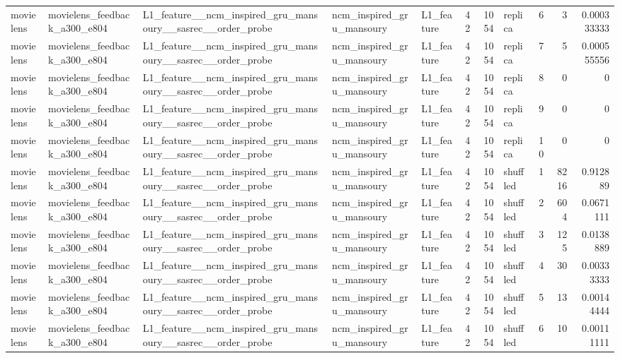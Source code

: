 \begin{table}[htbp!]
\begin{tabular}{lllllrrlrrr}
movielens & movielens\_feedback\_a300\_e804 & L1\_feature\_\_ncm\_inspired\_gru\_mansoury\_\_sasrec\_\_order\_probe & ncm\_inspired\_gru\_mansoury & L1\_feature & 42 & 1054 & replica & 6 & 3 & 0.000333333 \\
movielens & movielens\_feedback\_a300\_e804 & L1\_feature\_\_ncm\_inspired\_gru\_mansoury\_\_sasrec\_\_order\_probe & ncm\_inspired\_gru\_mansoury & L1\_feature & 42 & 1054 & replica & 7 & 5 & 0.000555556 \\
movielens & movielens\_feedback\_a300\_e804 & L1\_feature\_\_ncm\_inspired\_gru\_mansoury\_\_sasrec\_\_order\_probe & ncm\_inspired\_gru\_mansoury & L1\_feature & 42 & 1054 & replica & 8 & 0 & 0 \\
movielens & movielens\_feedback\_a300\_e804 & L1\_feature\_\_ncm\_inspired\_gru\_mansoury\_\_sasrec\_\_order\_probe & ncm\_inspired\_gru\_mansoury & L1\_feature & 42 & 1054 & replica & 9 & 0 & 0 \\
movielens & movielens\_feedback\_a300\_e804 & L1\_feature\_\_ncm\_inspired\_gru\_mansoury\_\_sasrec\_\_order\_probe & ncm\_inspired\_gru\_mansoury & L1\_feature & 42 & 1054 & replica & 10 & 0 & 0 \\
movielens & movielens\_feedback\_a300\_e804 & L1\_feature\_\_ncm\_inspired\_gru\_mansoury\_\_sasrec\_\_order\_probe & ncm\_inspired\_gru\_mansoury & L1\_feature & 42 & 1054 & shuffled & 1 & 8216 & 0.912889 \\
movielens & movielens\_feedback\_a300\_e804 & L1\_feature\_\_ncm\_inspired\_gru\_mansoury\_\_sasrec\_\_order\_probe & ncm\_inspired\_gru\_mansoury & L1\_feature & 42 & 1054 & shuffled & 2 & 604 & 0.0671111 \\
movielens & movielens\_feedback\_a300\_e804 & L1\_feature\_\_ncm\_inspired\_gru\_mansoury\_\_sasrec\_\_order\_probe & ncm\_inspired\_gru\_mansoury & L1\_feature & 42 & 1054 & shuffled & 3 & 125 & 0.0138889 \\
movielens & movielens\_feedback\_a300\_e804 & L1\_feature\_\_ncm\_inspired\_gru\_mansoury\_\_sasrec\_\_order\_probe & ncm\_inspired\_gru\_mansoury & L1\_feature & 42 & 1054 & shuffled & 4 & 30 & 0.00333333 \\
movielens & movielens\_feedback\_a300\_e804 & L1\_feature\_\_ncm\_inspired\_gru\_mansoury\_\_sasrec\_\_order\_probe & ncm\_inspired\_gru\_mansoury & L1\_feature & 42 & 1054 & shuffled & 5 & 13 & 0.00144444 \\
movielens & movielens\_feedback\_a300\_e804 & L1\_feature\_\_ncm\_inspired\_gru\_mansoury\_\_sasrec\_\_order\_probe & ncm\_inspired\_gru\_mansoury & L1\_feature & 42 & 1054 & shuffled & 6 & 10 & 0.00111111 \\

\end{tabular}
\end{table}

